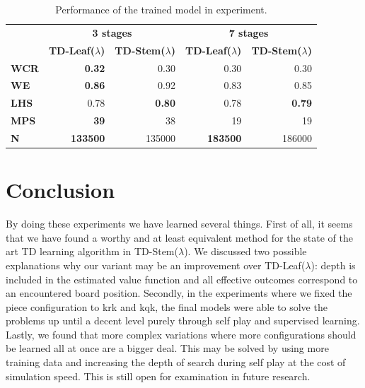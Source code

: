 \begin{table}[]
\centering
\caption{Performance of the trained model in experiment.}
\label{tab:perf_3p}
\begin{tabular}{l|rr|rr}
& \multicolumn{2}{c|}{\textbf{3 stages}} & \multicolumn{2}{c}{\textbf{7 stages}} \\

    &\multicolumn{1}{l}{\textbf{TD-Leaf($\lambda$)}} & \multicolumn{1}{l|}{\textbf{TD-Stem($\lambda$)}}&\multicolumn{1}{l}{\textbf{TD-Leaf($\lambda$)}} & \multicolumn{1}{l}{\textbf{TD-Stem($\lambda$)}} \\ \hline
\textbf{WCR} &\textbf{0.32} & 0.30 & 0.30                                  & 0.30                          \\
\textbf{WE} & \textbf{0.86} & 0.92 & 0.83                          & 0.85                                   \\
\textbf{LHS} & 0.78 &\textbf{ 0.80} & 0.78                                   & \textbf{0.79}                          \\
\textbf{MPS} & \textbf{39} & 38 & 19                           & 19                                    \\
\textbf{N } & \textbf{133500} & 135000  & \textbf{183500}                                & 186000                     
\end{tabular}
\end{table}

\section{Conclusion}

By doing these experiments we have learned several things. First of all, it seems that we have found a worthy and at least equivalent method for the state of the art TD learning algorithm in TD-Stem($\lambda$). We discussed two possible explanations why our variant may be an improvement over TD-Leaf($\lambda$): depth is included in the estimated value function and all effective outcomes correspond to an encountered board position. Secondly, in the experiments where we fixed the piece configuration to \gls{krk} and \gls{kqk}, the final models were able to solve the problems up until a decent level purely through self play and supervised learning. Lastly, we found that more complex variations where more configurations should be learned all at once are a bigger deal. This may be solved by using more training data and increasing the depth of search during self play at the cost of simulation speed. This is still open for examination in future research.
